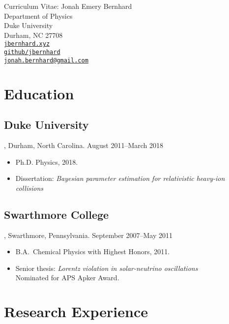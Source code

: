 \documentclass[letterpaper,10pt]{article}
\begin{document}
\begin{center}
  \Large
  Curriculum Vitae:  Jonah Emery Bernhard \\[1ex]
  \normalsize\rm
  Department of Physics \\
  Duke University \\
  Durham, NC 27708 \\[1ex]
  \href{http://jbernhard.xyz}{\nolinkurl{jbernhard.xyz}} \\
  \href{https://github.com/jbernhard}{\nolinkurl{github/jbernhard}} \\
  \href{mailto:jonah.bernhard@gmail.com}{\nolinkurl{jonah.bernhard@gmail.com}}
\end{center}


\section{Education}


\subsection{Duke University}, Durham, North Carolina. \hfill August 2011--March 2018

\begin{itemize}
  \item Ph.D. Physics, 2018.
  \item Dissertation: \emph{Bayesian parameter estimation for relativistic heavy-ion collisions}
\end{itemize}


\subsection{Swarthmore College}, Swarthmore, Pennsylvania. \hfill September 2007--May 2011

\begin{itemize}
  \item B.A.\ Chemical Physics with Highest Honors, 2011.
  \item Senior thesis:  \emph{Lorentz violation in solar-neutrino oscillations} \\
          Nominated for APS Apker Award.
\end{itemize}



\section{Research Experience}
\end{document}
